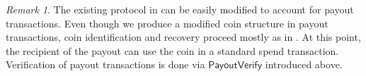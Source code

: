 \documentclass{article}
\newcommand{\func}[1]{\mathsf{#1}}
\theoremstyle{remark}
\newtheorem*{remark}{Remark}
\begin{document}
\begin{remark}
The existing protocol in \cite{spark} can be easily modified to account for payout transactions.
Even though we produce a modified coin structure in payout transactions, coin identification and recovery proceed mostly as in \cite{spark}.
At this point, the recipient of the payout can use the coin in a standard spend transaction.
Verification of payout transactions is done via $\func{PayoutVerify}$ introduced above.
\end{remark}




\end{document}
